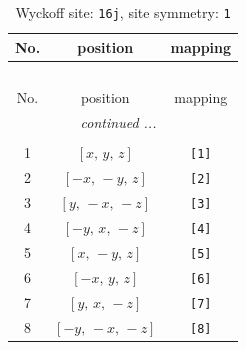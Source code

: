 \documentclass[fleqn,8pt]{jsarticle}
\begin{document}
\renewcommand{\arraystretch}{1.2}
\begin{longtable}{ccc}
\caption{Wyckoff site: {\tt 16j}, site symmetry: {\tt 1}}
 \\
 \hline \hline
No. & position & mapping \\ \hline \endfirsthead

\multicolumn{2}{l}{\tablename\ \thetable{}} \\
 \hline \hline
No. & position & mapping \\ \hline \endhead

 \hline \hline
\multicolumn{2}{r}{\footnotesize\it continued ...} \\ \endfoot

 \hline \hline
\multicolumn{2}{r}{} \\ \endlastfoot

1 & $\left[ x,\, y,\, z \right]$ & {\tt [1]} \\ \hline
2 & $\left[ - x,\, - y,\, z \right]$ & {\tt [2]} \\ \hline
3 & $\left[ y,\, - x,\, - z \right]$ & {\tt [3]} \\ \hline
4 & $\left[ - y,\, x,\, - z \right]$ & {\tt [4]} \\ \hline
5 & $\left[ x,\, - y,\, z \right]$ & {\tt [5]} \\ \hline
6 & $\left[ - x,\, y,\, z \right]$ & {\tt [6]} \\ \hline
7 & $\left[ y,\, x,\, - z \right]$ & {\tt [7]} \\ \hline
8 & $\left[ - y,\, - x,\, - z \right]$ & {\tt [8]} \\
\end{longtable}
\end{document}
